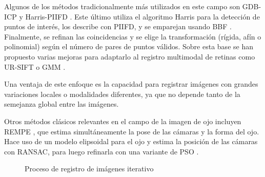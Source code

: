 Algunos de los métodos tradicionalmente más utilizados en este campo son \gls{GDB-ICP} \cite{GDB-ICP} y Harris-PIIFD \cite{piifd}. Este último utiliza el algoritmo Harris \cite{Harris1988ACC} para la detección de puntos de interés, los describe con \gls{PIIFD}, y se emparejan usando \gls{BBF} \cite{BBF}.
Finalmente, se refinan las coincidencias y se elige la transformación (rígida, afín o polinomial) según el número de pares de puntos válidos. Sobre esta base se han propuesto varias mejoras para adaptarlo al registro multimodal de retinas como UR-SIFT \cite{ur-sift} o \gls{GMM} \cite{GMM}.

Una ventaja de este enfoque es la capacidad para registrar imágenes con grandes variaciones locales o modalidades diferentes, ya que no depende tanto de la semejanza global entre las imágenes.

Otros métodos clásicos relevantes en el campo de la imagen de ojo incluyen REMPE \cite{rempe}, que estima simultáneamente la pose de las cámaras y la forma del ojo. Hace uso de un modelo elipsoidal para el ojo y estima la posición de las cámaras con RANSAC, para luego refinarla con una variante de PSO \cite{pso}.

\begin{figure}[tbp]
\centering
{}
\caption{Proceso de registro de imágenes iterativo}
\label{fig:rexistro_iterativo}
\end{figure}


